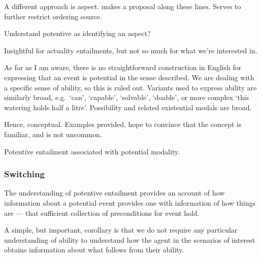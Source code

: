 \begin{note}[Aspect]
  A different approach is aspect.
  \citeauthor{Hacquard:2006to} makes a proposal along these lines.
  Serves to further restrict ordering source.

  Understand potentive as identifying an aspect?

  Insightful for actuality entailments, but not so much for what we're interested in.
\end{note}

\begin{note}[English]
  As far as I am aware, there is no straightforward construction in English for expressing that an event is potential in the sense described.
  We are dealing with a specific sense of ability, so this is ruled out.
  Variants used to express ability are similarly broad, e.g.\ `can', `capable', `solvable', `doable', or more complex `this watering holds half a litre'.
  Possibility and related existential modals are broad.

  Hence, conceptual.
  Examples provided, hope to convince that the concept is familiar, and is not uncommon.
\end{note}

\begin{note}[Summarising]
  Potentive entailment associated with potential modality.
\end{note}

\subsubsection{Switching}
\label{sec:switching}

\begin{note}[Moving on]
  The understanding of potentive entailment provides an account of how information about a potential event provides one with information of how things are --- that sufficient collection of preconditions for event hold.

  A simple, but important, corollary is that we do not require any particular understanding of ability to understand how the agent in the scenarios of interest obtains information about what follows from their ability.
\end{note}

